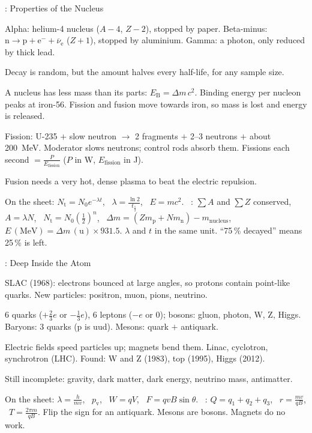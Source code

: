 \begin{summarybox}[fontupper=\small]{: Properties of the Nucleus}
\begin{sumlist}
  \item Alpha: helium-4 nucleus ($A - 4$, $Z - 2$), stopped by paper. Beta-minus:
        $\mathrm{n} \to \mathrm{p} + \mathrm{e}^- + \overline{\nu}_\mathrm{e}$ ($Z + 1$),
        stopped by aluminium. Gamma: a photon, only reduced by thick lead.
  \item Decay is random, but the amount halves every half-life, for any sample size.
  \item A nucleus has less mass than its parts: $E_\mathrm{B} = \Delta m\,c^2$. Binding
        energy per nucleon peaks at iron-56. Fission and fusion move towards iron, so
        mass is lost and energy is released.
  \item Fission: U-235 $+$ slow neutron $\to$ 2 fragments $+$ 2--3 neutrons $+$
        about \qty{200}{MeV}. Moderator slows neutrons; control rods absorb them.
        Fissions each second $= \frac{P}{E_\mathrm{fission}}$ ($P$ in W, $E_\mathrm{fission}$
        in J).
  \item Fusion needs a very hot, dense plasma to beat the electric repulsion.
\end{sumlist}
 On the sheet: $N_\mathrm{t} = N_0 e^{-\lambda t}$, \
$\lambda = \frac{\ln 2}{t_{\frac{1}{2}}}$, \ $E = mc^2$. \ \sumLearn: $\sum A$ and
$\sum Z$ conserved, \ $A = \lambda N$, \ $N_\mathrm{t} = N_0\left(\frac{1}{2}\right)^n$, \
$\Delta m = (Zm_\mathrm{p} + Nm_\mathrm{n}) - m_\mathrm{nucleus}$, \
$E\,(\mathrm{MeV}) = \Delta m\,(\mathrm{u}) \times 931.5$.
\sumhead{Traps} $\lambda$ and $t$ in the same unit. ``75\,\% decayed'' means 25\,\% is
left.
\end{summarybox}

\begin{summarybox}[fontupper=\small]{: Deep Inside the Atom}
\begin{sumlist}
  \item SLAC (1968): electrons bounced at large angles, so protons contain point-like
        quarks. New particles: positron, muon, pions, neutrino.
  \item 6 quarks ($+\frac23 e$ or $-\frac13 e$), 6 leptons ($-e$ or 0); bosons: gluon,
        photon, W, Z, Higgs. Baryons: 3 quarks (p is uud). Mesons: quark $+$ antiquark.
  \item Electric fields speed particles up; magnets bend them. Linac, cyclotron,
        synchrotron (LHC). Found: W and Z (1983), top (1995), Higgs (2012).
  \item Still incomplete: gravity, dark matter, dark energy, neutrino mass, antimatter.
\end{sumlist}
\sumhead{Formulas} On the sheet: $\lambda = \frac{h}{mv}$, \ $p_\mathrm{v}$, \
$W = qV$, \ $F = qvB\sin\theta$. \ \sumLearn: $Q = q_1 + q_2 + q_3$, \
$r = \frac{mv}{qB}$, \ $T = \frac{2\pi m}{qB}$.
\sumhead{Traps} Flip the sign for an antiquark. Mesons are bosons. Magnets do no work.
\end{summarybox}
